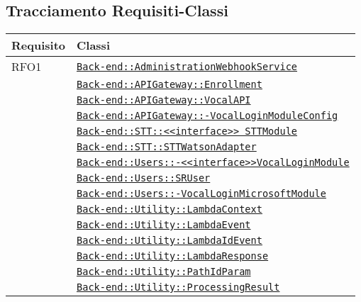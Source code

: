 \subsection{Tracciamento Requisiti-Classi}
\normalsize
\begin{longtable}{|>{\centering}m{3cm}|m{10cm}<{\centering}|}
\hline 
\textbf{Requisito} & \textbf{Classi}\\
\hline
\endhead
RFO1 & \hyperref[Back-end::AdministrationWebhookService]{\texttt{Back-end::AdministrationWebhookService}}\\
& \hyperref[Back-end::APIGateway::Enrollment]{\texttt{Back-end::APIGateway::Enrollment}}\\
& \hyperref[Back-end::APIGateway::VocalAPI]{\texttt{Back-end::APIGateway::VocalAPI}}\\
& \hyperref[Back-end::APIGateway::VocalLoginModuleConfig]{\texttt{Back-end::APIGateway::-\linebreak VocalLoginModuleConfig}}\\
& \hyperref[Back-end::STT::<<interface>> STTModule]{\texttt{Back-end::STT::<<interface>> STTModule}}\\
& \hyperref[Back-end::STT::STTWatsonAdapter]{\texttt{Back-end::STT::STTWatsonAdapter}}\\
& \hyperref[Back-end::Users::<<interface>>VocalLoginModule]{\texttt{Back-end::Users::-\linebreak <<interface>>VocalLoginModule}}\\
& \hyperref[Back-end::Users::SRUser]{\texttt{Back-end::Users::SRUser}}\\
& \hyperref[Back-end::Users::VocalLoginMicrosoftModule]{\texttt{Back-end::Users::-\linebreak VocalLoginMicrosoftModule}}\\
& \hyperref[Back-end::Utility::LambdaContext]{\texttt{Back-end::Utility::LambdaContext}}\\
& \hyperref[Back-end::Utility::LambdaEvent]{\texttt{Back-end::Utility::LambdaEvent}}\\
& \hyperref[Back-end::Utility::LambdaIdEvent]{\texttt{Back-end::Utility::LambdaIdEvent}}\\
& \hyperref[Back-end::Utility::LambdaResponse]{\texttt{Back-end::Utility::LambdaResponse}}\\
& \hyperref[Back-end::Utility::PathIdParam]{\texttt{Back-end::Utility::PathIdParam}}\\
& \hyperref[Back-end::Utility::ProcessingResult]{\texttt{Back-end::Utility::ProcessingResult}}\\

\end{longtable}
